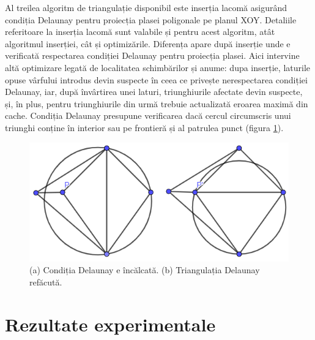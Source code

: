 \documentclass[12pt]{article}
\begin{document}
Al treilea algoritm de triangulație disponibil este inserția lacomă asigurând condiția Delaunay pentru proiecția plasei poligonale pe planul XOY. Detaliile referitoare la inserția lacomă sunt valabile și pentru acest algoritm, atât algoritmul inserției, cât și optimizările. Diferența apare după inserție unde e verificată respectarea condiției Delaunay pentru proiecția plasei. Aici intervine altă optimizare legată de localitatea schimbărilor și anume: dupa inserție, laturile opuse vârfului introdus devin suspecte în ceea ce privește nerespectarea condiției Delaunay, iar, după învârtirea unei laturi, triunghiurile afectate devin suspecte, și, în plus, pentru triunghiurile din urmă trebuie actualizată eroarea maximă din cache. Condiția Delaunay presupune verificarea dacă cercul circumscris unui triunghi conține în interior sau pe frontieră și al patrulea punct (figura \ref{fig:fig16}).

\begin{figure}[!htb]
	\begin{minipage}{0.5\textwidth}
		\centering
		\includegraphics[width=.95\linewidth]{Delaunay.PNG}
		\caption{(a) Condiția Delaunay e încălcată. (b) Triangulația Delaunay refăcută.}\label{fig:fig16}
	\end{minipage}\hfill
\end{figure}

\section{Rezultate experimentale}
\end{document}

